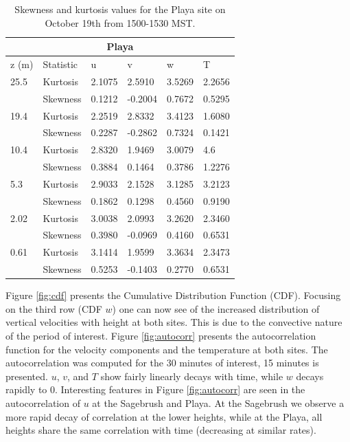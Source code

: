 \documentclass[]{article}
\begin{document}
\begin{table}
\begin{tabular}{ |p{1cm}|p{1.5cm}|p{1cm}|p{1.25cm}|p{1cm}| p{1.25cm}|}
	\hline
	\multicolumn{6}{|c|}{Playa} \\
	\hline\hline
	z (m) & Statistic & u &  v & w & T\\
	\hline
	25.5 & Kurtosis & 2.1075 & 2.5910 & 3.5269 &  2.2656\\
	&Skewness & 0.1212 & -0.2004 & 0.7672 & 0.5295\\
	\hline
	19.4 & Kurtosis & 2.2519 & 2.8332 & 3.4123 &1.6080 \\
	&Skewness & 0.2287 & -0.2862 & 0.7324 & 0.1421\\
	\hline
	10.4 & Kurtosis & 2.8320 & 1.9469 & 3.0079 &4.6 \\
	&Skewness & 0.3884 & 0.1464 & 0.3786 &1.2276\\
	\hline
	5.3 & Kurtosis & 2.9033 & 2.1528  & 3.1285 & 3.2123  \\
	&Skewness & 0.1862 & 0.1298 & 0.4560 & 0.9190\\
	\hline
	2.02 & Kurtosis &\cellcolor{red!25} 3.0038 & 2.0993 & 3.2620  & 2.3460\\
	&Skewness & \cellcolor{blue!25} 0.3980 & -0.0969 & 0.4160 & 0.6531\\
	\hline
	0.61 & Kurtosis & \cellcolor{red!25} 3.1414 & 1.9599 & 3.3634  & 2.3473\\
	&Skewness & \cellcolor{blue!25} 0.5253 & -0.1403 & 0.2770 &0.6531\\
	\hline
\end{tabular}
\caption{Skewness and kurtosis values for the Playa site on October 19th from 1500-1530 MST. }
\label{tab:kurt_playa}
\end{table}
Figure \ref{fig:cdf} presents the Cumulative Distribution Function (CDF). Focusing on the third row (CDF $w$) one can now see of the increased distribution of vertical velocities with height at both sites. This is due to the convective nature of the period of interest. Figure \ref{fig:autocorr} presents the autocorrelation function for the velocity components and the temperature at both sites. The autocorrelation was computed for the 30 minutes of interest, 15 minutes is presented. $u$, $v$, and $T$ show fairly linearly decays with time, while $w$ decays rapidly to 0. Interesting features in Figure \ref{fig:autocorr} are seen in the autocorrelation of $u$ at the Sagebrush and Playa. At the Sagebrush we observe a more rapid decay of correlation at the lower heights, while at the Playa, all heights share the same correlation with time (decreasing at similar rates). 
\end{document}

